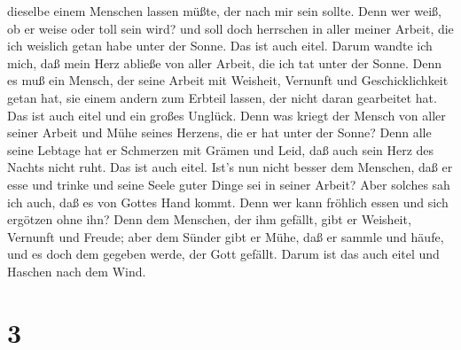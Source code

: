 dieselbe einem Menschen lassen müßte, der nach mir sein sollte.
 Denn wer weiß, ob er weise oder toll sein wird? und soll
doch herrschen in aller meiner Arbeit, die ich weislich getan habe unter
der Sonne. Das ist auch eitel.  Darum wandte ich mich, daß
mein Herz abließe von aller Arbeit, die ich tat unter der Sonne.
 Denn es muß ein Mensch, der seine Arbeit mit Weisheit,
Vernunft und Geschicklichkeit getan hat, sie einem andern zum Erbteil
lassen, der nicht daran gearbeitet hat. Das ist auch eitel und ein
großes Unglück.  Denn was kriegt der Mensch von aller
seiner Arbeit und Mühe seines Herzens, die er hat unter der Sonne?
 Denn alle seine Lebtage hat er Schmerzen mit Grämen und
Leid, daß auch sein Herz des Nachts nicht ruht. Das ist auch eitel.
 Ist's nun nicht besser dem Menschen, daß er esse und
trinke und seine Seele guter Dinge sei in seiner Arbeit? Aber solches
sah ich auch, daß es von Gottes Hand kommt.  Denn wer kann
fröhlich essen und sich ergötzen ohne ihn?  Denn dem
Menschen, der ihm gefällt, gibt er Weisheit, Vernunft und Freude; aber
dem Sünder gibt er Mühe, daß er sammle und häufe, und es doch dem
gegeben werde, der Gott gefällt. Darum ist das auch eitel und Haschen
nach dem Wind.

\hypertarget{section-2}{%
\section{3}\label{section-2}}

